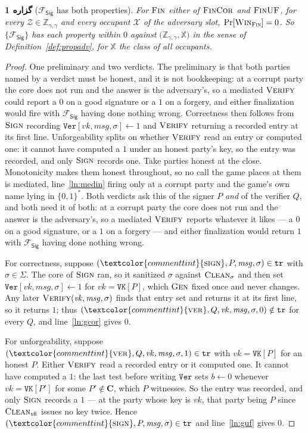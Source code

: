 \documentclass[10pt,oneside,openany]{book}
\newcommand{\Cs}{\mathbf{C}}
\newcommand{\Zenv}{\mathcal{Z}}
\newcommand{\ZenvSet}{\mathbb{Z}}
\newcommand{\op}[1]{\textnormal{\textsc{#1}}}
\newcommand{\atom}[1]{\textcolor{commenttint}{\op{#1}}}
\newcommand{\Xset}{\mathbb{X}}
\newcommand{\Win}{\op{Win}}
\newcommand{\Fsig}{\mathcal{F}_{\mathsf{Sig}}}
\newcommand{\vk}{\mathit{vk}}
\newcommand{\msg}{\mathit{msg}}
\newcommand{\Sigs}{\Sigma}
\newcommand{\Clean}{\op{Clean}}
\newcommand{\V}[1]{\mathtt{#1}}
\newcommand{\bits}{\{0,1\}^*}
\theoremstyle{accentdef}
\theoremstyle{accentplain}
\newtheorem{proposition}[definition]{گزاره}
\begin{document}
\begin{proposition}[$\Fsig$ has both properties]\label{prop:sigprops}
For $\op{Fin}$ either of $\op{FinCor}$ and $\op{FinUF}$, for every
$\Zenv \in \ZenvSet_{\gamma,\gamma}$
and every occupant $\mathcal{X}$ of the adversary slot, $\Pr[\Win_{\op{Fin}}] = 0$. So $\{\Fsig\}$ has
each
property within $0$ against $\bigl(\ZenvSet_{\gamma,\gamma},\Xset\bigr)$ in the sense of
Definition~\ref{def:propadv}, for $\Xset$ the class of all occupants.
\end{proposition}

\begin{proof}
One preliminary and two verdicts. The preliminary is that both parties named by a verdict must be
honest, and it is not bookkeeping: at a corrupt party the core does not run and the answer is the
adversary's, so a mediated $\op{Verify}$ could report a $0$ on a good signature or a $1$ on a
forgery, and either finalization would fire with $\Fsig$ having done nothing wrong. Correctness then
follows from $\op{Sign}$ recording $\V{Ver}[\vk,\msg,\sigma] \gets 1$ and $\op{Verify}$ returning a
recorded entry at its first line. Unforgeability splits on whether $\op{Verify}$ read an entry or
computed one: it cannot have computed a $1$ under an honest party's key, so the entry was recorded,
and only $\op{Sign}$ records one.
Take parties honest at the close. Monotonicity makes them honest throughout, so no call the game
places at them is mediated, line~\ref{ln:medin} firing only at a corrupt party and the game's own name
lying in $\bits$. Both verdicts ask this of the signer $P$ \emph{and} of the verifier $Q$, and both
need it of both: at a corrupt party the core does not run and the answer is the adversary's, so a
mediated $\op{Verify}$ reports whatever it likes --- a $0$ on a good signature, or a $1$ on a
forgery --- and either finalization would return $1$ with $\Fsig$ having done nothing wrong.

For correctness, suppose $(\atom{sign},P,\msg,\sigma) \in \V{tr}$ with $\sigma \in \Sigs$. The core of
$\op{Sign}$ ran, so it sanitized $\sigma$ against $\Clean_{\sigma}$ and then set
$\V{Ver}[\vk,\msg,\sigma] \gets 1$ for $\vk = \V{VK}[P]$, which $\op{Gen}$ fixed once and never
changes. Any later $\op{Verify}(\vk,\msg,\sigma)$ finds that entry set and returns it at its first
line, so it returns $1$; thus $(\atom{ver},Q,\vk,\msg,\sigma,0) \notin \V{tr}$ for every $Q$, and
line~\ref{ln:gcor} gives $0$.

For unforgeability, suppose $(\atom{ver},Q,\vk,\msg,\sigma,1) \in \V{tr}$ with
$\vk = \V{VK}[P]$ for an honest $P$. Either $\op{Verify}$ read a recorded entry or it computed one.
It cannot have computed a $1$: the last test before writing $\V{Ver}$ sets $b \gets 0$ whenever
$\vk = \V{VK}[P']$ for some $P' \notin \Cs$, which $P$ witnesses. So the entry was recorded, and only
$\op{Sign}$ records a $1$ --- at the party whose key is $\vk$, that party being $P$ since
$\Clean_{\vk}$ issues no key twice. Hence $(\atom{sign},P,\msg,\sigma) \in \V{tr}$ and
line~\ref{ln:guf} gives $0$.
\end{proof}
\end{document}
